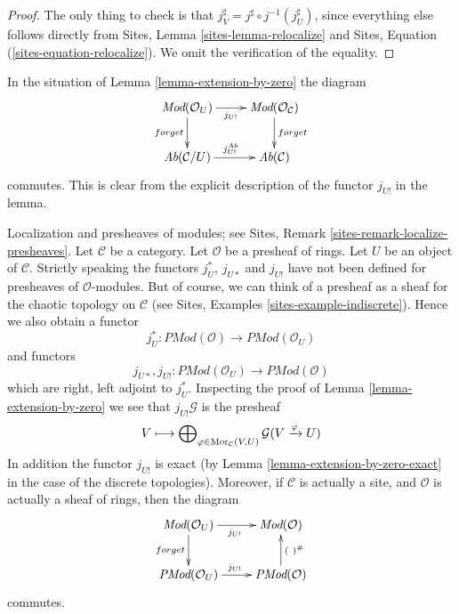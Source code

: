 \begin{proof}
The only thing to check is that
$j_V^\sharp = j^\sharp \circ j^{-1}(j_U^\sharp)$,
since everything else follows directly from
Sites, Lemma \ref{sites-lemma-relocalize} and
Sites, Equation (\ref{sites-equation-relocalize}).
We omit the verification of the equality.
\end{proof}

\begin{remark}
\label{remark-localize-shriek-equal}
In the situation of Lemma \ref{lemma-extension-by-zero}
the diagram
$$
\xymatrix{
\textit{Mod}(\mathcal{O}_U) \ar[r]_{j_{U!}} \ar[d]_{forget} &
\textit{Mod}(\mathcal{O}_\mathcal{C}) \ar[d]^{forget} \\
\textit{Ab}(\mathcal{C}/U) \ar[r]^{j^{Ab}_{U!}} &
\textit{Ab}(\mathcal{C})
}
$$
commutes. This is clear from the explicit description of the functor
$j_{U!}$ in the lemma.
\end{remark}

\begin{remark}
\label{remark-localize-presheaves}
Localization and presheaves of modules; see
Sites, Remark \ref{sites-remark-localize-presheaves}.
Let $\mathcal{C}$ be a category.
Let $\mathcal{O}$ be a presheaf of rings.
Let $U$ be an object of $\mathcal{C}$.
Strictly speaking the functors $j_U^*$, $j_{U*}$ and $j_{U!}$
have not been defined for presheaves of $\mathcal{O}$-modules.
But of course, we can think of a presheaf as a sheaf for the
chaotic topology on $\mathcal{C}$ (see
Sites, Examples \ref{sites-example-indiscrete}).
Hence we also obtain a functor
$$
j_U^* :
\textit{PMod}(\mathcal{O})
\longrightarrow
\textit{PMod}(\mathcal{O}_U)
$$
and functors
$$
j_{U*}, j_{U!} :
\textit{PMod}(\mathcal{O}_U)
\longrightarrow
\textit{PMod}(\mathcal{O})
$$
which are right, left adjoint to $j_U^*$. Inspecting the proof of
Lemma \ref{lemma-extension-by-zero} we see that $j_{U!}\mathcal{G}$
is the presheaf
$$
V \longmapsto
\bigoplus\nolimits_{\varphi \in \mathop{\mathrm{Mor}}\nolimits_\mathcal{C}(V, U)}
\mathcal{G}(V \xrightarrow{\varphi} U)
$$
In addition the functor $j_{U!}$ is exact (by
Lemma \ref{lemma-extension-by-zero-exact} in the
case of the discrete topologies). Moreover, if $\mathcal{C}$
is actually a site, and $\mathcal{O}$ is actually a sheaf of rings,
then the diagram
$$
\xymatrix{
\textit{Mod}(\mathcal{O}_U) \ar[r]_{j_{U!}} \ar[d]_{forget} &
\textit{Mod}(\mathcal{O}) \\
\textit{PMod}(\mathcal{O}_U) \ar[r]^{j_{U!}} &
\textit{PMod}(\mathcal{O}) \ar[u]_{(\ )^\#}
}
$$
commutes.
\end{remark}

